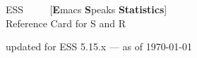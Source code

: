 \documentclass[a4paper]{article}
\begin{document}
\begin{center}
  {\LARGE ESS \ \ \ \ {\large
      [\textbf{E}macs \textbf{S}peaks \textbf{Statistics}]}
      \\[.5ex] Reference Card for S and R}

  \smallskip

  {\small updated for ESS 5.15.x}%
           \footnotesize --- as of \today
\end{center}
\end{document}
